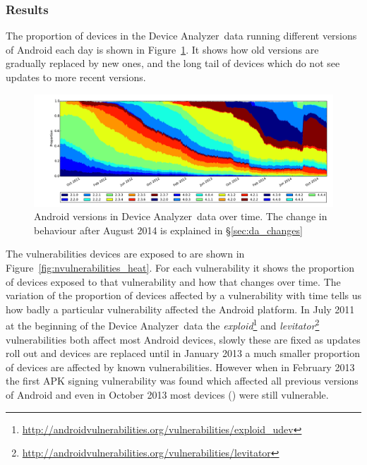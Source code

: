 \documentclass[conference,a4paper,twoside]{IEEEtran}
\newcommand{\da}{Device Analyzer}
\begin{document}
\subsubsection{Results}
The proportion of devices in the \da\ data running different versions of Android each day is shown in Figure~\ref{fig:norm_os}.
It shows how old versions are gradually replaced by new ones, and the long tail of devices which do not see updates to more recent versions.

\begin{figure}
 \centering
 \includegraphics[width=\textwidth]{figures/da_norm_os}
 \caption{Android versions in \da\ data over time. The change in behaviour after August 2014 is explained in \S\ref{sec:da_changes}}
 \label{fig:norm_os}
\end{figure}

The vulnerabilities devices are exposed to are shown in Figure~\ref{fig:nvulnerabilities_heat}.
For each vulnerability it shows the proportion of devices exposed to that vulnerability and how that changes over time.
The variation of the proportion of devices affected by a vulnerability with time tells us how badly a particular vulnerability affected the Android platform.
In July 2011 at the beginning of the \da\ data the \emph{exploid}\footnote{\url{http://androidvulnerabilities.org/vulnerabilities/exploid_udev}} and \emph{levitator}\footnote{\url{http://androidvulnerabilities.org/vulnerabilities/levitator}} vulnerabilities both affect most Android devices, slowly these are fixed as updates roll out and devices are replaced until in January 2013 a much smaller proportion of devices are affected by known vulnerabilities.
However when in February 2013 the first APK signing vulnerability was found which affected all previous versions of Android and even in October 2013 most devices (\daVulnAPKDuplicateFileOctoberPerc) were still vulnerable.
\end{document}
